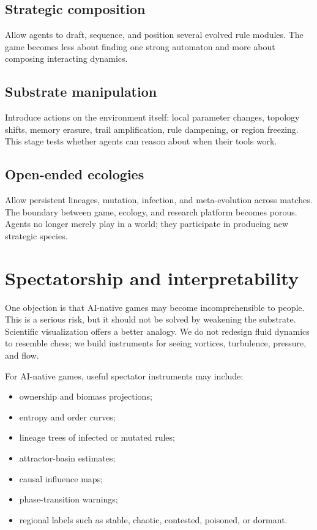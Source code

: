\subsection{Strategic composition}

Allow agents to draft, sequence, and position several evolved rule modules. The game becomes less about finding one strong automaton and more about composing interacting dynamics.

\subsection{Substrate manipulation}

Introduce actions on the environment itself: local parameter changes, topology shifts, memory erasure, trail amplification, rule dampening, or region freezing. This stage tests whether agents can reason about when their tools work.

\subsection{Open-ended ecologies}

Allow persistent lineages, mutation, infection, and meta-evolution across matches. The boundary between game, ecology, and research platform becomes porous. Agents no longer merely play in a world; they participate in producing new strategic species.

\section{Spectatorship and interpretability}\label{sec:spectatorship}

One objection is that AI-native games may become incomprehensible to people. This is a serious risk, but it should not be solved by weakening the substrate. Scientific visualization offers a better analogy. We do not redesign fluid dynamics to resemble chess; we build instruments for seeing vortices, turbulence, pressure, and flow.

For AI-native games, useful spectator instruments may include:
\begin{itemize}
  \item ownership and biomass projections;
  \item entropy and order curves;
  \item lineage trees of infected or mutated rules;
  \item attractor-basin estimates;
  \item causal influence maps;
  \item phase-transition warnings;
  \item regional labels such as stable, chaotic, contested, poisoned, or dormant.
\end{itemize}


